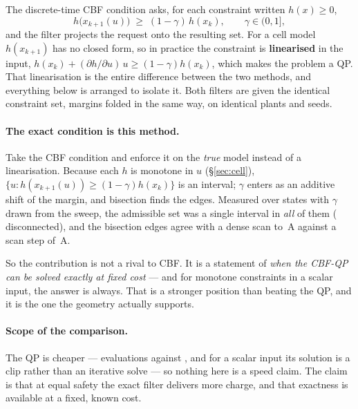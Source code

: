 \documentclass[11pt,letterpaper]{article}
\theoremstyle{definition}
\theoremstyle{remark}
\begin{document}
The discrete-time CBF condition \cite{agrawal2017dcbf} asks, for each constraint written
$h(x) \ge 0$,
\begin{equation}
h\bigl(x_{k+1}(u)\bigr) \;\ge\; (1-\gamma)\,h(x_k), \qquad \gamma \in (0,1],
\end{equation}
and the filter projects the request onto the resulting set. For a cell model $h(x_{k+1})$ has no
closed form, so in practice the constraint is \textbf{linearised} in the input,
$h(x_k) + (\partial h/\partial u)\,u \ge (1-\gamma) h(x_k)$, which makes the problem a QP. That
linearisation is the entire difference between the two methods, and everything below is arranged
to isolate it. Both filters are given the identical constraint set, margins folded in the same
way, on identical plants and seeds.

\paragraph{The exact condition is this method.} Take the CBF condition and enforce it on the
\emph{true} model instead of a linearisation. Because each $h$ is monotone in $u$
(\S\ref{sec:cell}), $\{u : h(x_{k+1}(u)) \ge (1-\gamma)h(x_k)\}$ is an interval; $\gamma$ enters
as an additive shift of the margin, and bisection finds the edges. Measured over
\cExactStates{} states with $\gamma$ drawn from the sweep, the admissible set was a single
interval in \emph{all} of them (\cExactDisc{} disconnected), and the bisection edges agree with a
dense scan to \cExactDev\,A against a scan step of \cExactScan\,A.

So the contribution is not a rival to CBF. It is a statement of \emph{when the CBF-QP can be
solved exactly at fixed cost} --- and for monotone constraints in a scalar input, the answer is
always. That is a stronger position than beating the QP, and it is the one the geometry actually
supports.


\paragraph{Scope of the comparison.} The QP is cheaper --- \cQpEval{} evaluations against
\cZgEval, and for a scalar input its solution is a clip rather than an iterative solve --- so
nothing here is a speed claim. The claim is that at equal safety the exact filter delivers more
charge, and that exactness is available at a fixed, known cost.
\end{document}
